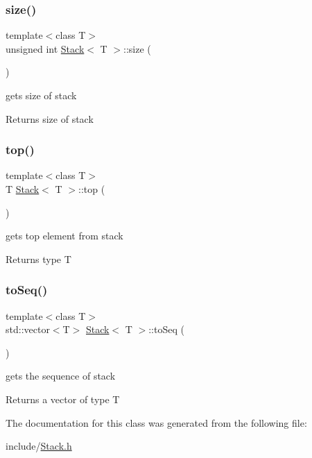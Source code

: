 \subsubsection{\texorpdfstring{size()}{size()}}
{\footnotesize\ttfamily template$<$class T$>$ \\
unsigned int \hyperlink{class_stack}{Stack}$<$ T $>$\+::size (\begin{DoxyParamCaption}{ }\end{DoxyParamCaption})}



gets size of stack 

\begin{DoxyReturn}{Returns}
size of stack 
\end{DoxyReturn}
\mbox{\label{class_stack_ad461f6de40c8672dbf743068f4515061}} 
\subsubsection{\texorpdfstring{top()}{top()}}
{\footnotesize\ttfamily template$<$class T$>$ \\
T \hyperlink{class_stack}{Stack}$<$ T $>$\+::top (\begin{DoxyParamCaption}{ }\end{DoxyParamCaption})}

gets top element from stack \begin{DoxyReturn}{Returns}
type T 
\end{DoxyReturn}
\mbox{\label{class_stack_a928be02635c7f5bf2bab3699aee07f52}} 
\subsubsection{\texorpdfstring{to\+Seq()}{toSeq()}}
{\footnotesize\ttfamily template$<$class T$>$ \\
std\+::vector$<$T$>$ \hyperlink{class_stack}{Stack}$<$ T $>$\+::to\+Seq (\begin{DoxyParamCaption}{ }\end{DoxyParamCaption})}

gets the sequence of stack \begin{DoxyReturn}{Returns}
a vector of type T 
\end{DoxyReturn}


The documentation for this class was generated from the following file\+:\begin{DoxyCompactItemize}
\item 
include/\hyperlink{_stack_8h}{Stack.\+h}\end{DoxyCompactItemize}
